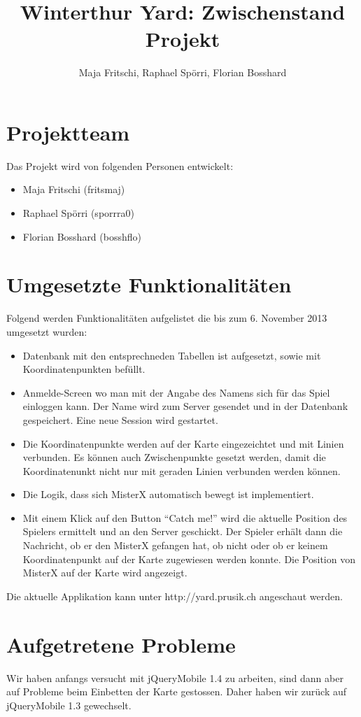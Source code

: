 \documentclass[11pt]{article}
\title{Winterthur Yard: Zwischenstand Projekt}
\author{Maja Fritschi, Raphael Spörri, Florian Bosshard}
\date{}
\begin{document}
\maketitle

\tableofcontents
\newpage

\section{Projektteam}
Das Projekt wird von folgenden Personen entwickelt:
\begin{itemize}
\item Maja Fritschi (fritsmaj)
\item Raphael Spörri (sporrra0)
\item Florian Bosshard (bosshflo)
\end{itemize}


\section{Umgesetzte Funktionalitäten}
Folgend werden Funktionalitäten aufgelistet die bis zum 6. November 2013 umgesetzt wurden: 
\begin{itemize}
\item Datenbank mit den entsprechneden Tabellen ist aufgesetzt, sowie mit Koordinatenpunkten befüllt.
\item Anmelde-Screen wo man mit der Angabe des Namens sich für das Spiel einloggen kann. Der Name wird zum Server gesendet und in der Datenbank gespeichert. Eine neue Session wird gestartet.
\item Die Koordinatenpunkte werden auf der Karte eingezeichtet und mit Linien verbunden. Es können auch Zwischenpunkte gesetzt werden, damit die Koordinatenunkt nicht nur mit geraden Linien verbunden werden können.
\item Die Logik, dass sich MisterX automatisch bewegt ist implementiert.
\item Mit einem Klick auf den Button ``Catch me!'' wird die aktuelle Position des Spielers ermittelt und an den Server geschickt. Der Spieler erhält dann die Nachricht, ob er den MisterX gefangen hat, ob nicht oder ob er keinem Koordinatenpunkt auf der Karte zugewiesen werden konnte. Die Position von MisterX auf der Karte wird angezeigt. 
\end{itemize}

Die aktuelle Applikation kann unter http://yard.prusik.ch angeschaut werden. 

\section{Aufgetretene Probleme}
Wir haben anfangs versucht mit jQueryMobile 1.4 zu arbeiten, sind dann aber auf Probleme beim Einbetten der Karte gestossen. Daher haben wir zurück auf jQueryMobile 1.3 gewechselt.
\end{document}
